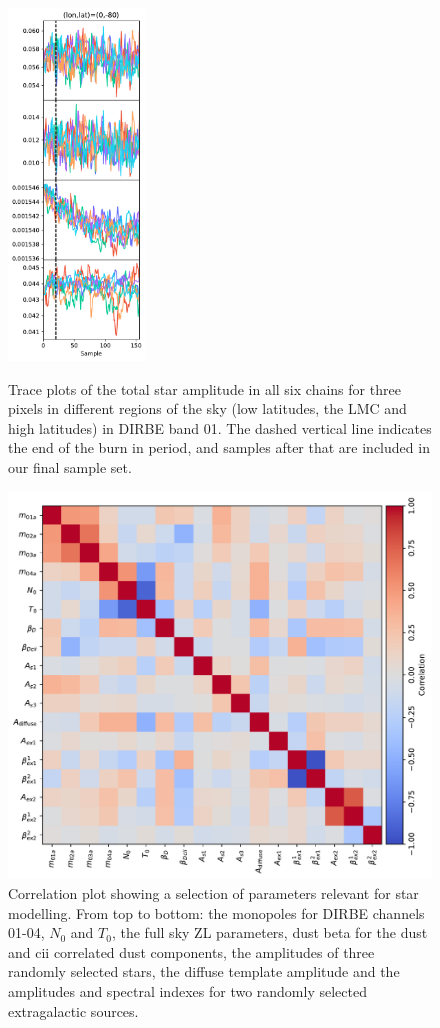 \documentclass{aa}
\begin{document}
\begin{figure}
  \includegraphics[width=0.326\textwidth]{figs/mixing/trace_3121308.pdf}\\
  \caption{Trace plots of the total star amplitude in all six chains for three pixels in different regions of the sky (low latitudes, the LMC and high latitudes) in DIRBE band 01. The dashed vertical line indicates the end of the burn in period, and samples after that are included in our final sample set.}
  \label{fig:amptrace}
\end{figure}

\begin{figure}
  \centering
  \includegraphics[width=\textwidth]{figs/correlation/covmatrix.pdf}
  \caption{Correlation plot showing a selection of parameters relevant for star modelling. From top to bottom: the monopoles for DIRBE channels 01-04, $N_{0}$ and $T_0$, the full sky ZL parameters, dust beta for the dust and cii correlated dust components, the amplitudes of three randomly selected stars, the diffuse template amplitude and the amplitudes and spectral indexes for two randomly selected extragalactic sources.}
  \label{fig:corr}
\end{figure}
\end{document}
